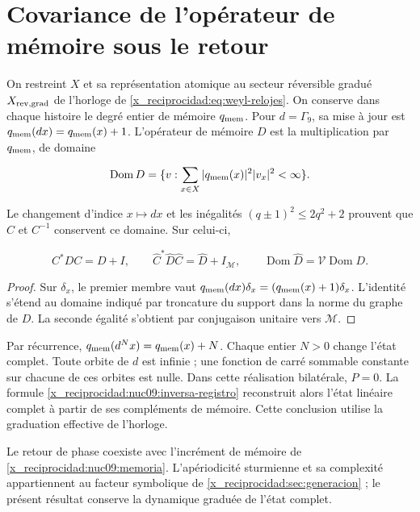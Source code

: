 \section{Covariance de l’opérateur de mémoire sous le retour}

On restreint \(X\) et sa représentation atomique au secteur réversible
gradué \(X_{\rm rev,grad}\) de l’horloge de
\eqref{x_reciprocidad:eq:weyl-relojes}. On conserve dans chaque histoire le degré entier
de mémoire \(q_{\rm mem}\). Pour \(d=\Gamma_9\), sa mise à jour est
\(q_{\rm mem}(dx)=q_{\rm mem}(x)+1\).
L’opérateur de mémoire \(D\) est la multiplication par
\(q_{\rm mem}\), de domaine



\[
\operatorname{Dom}D=\{v:\sum_{x\in X}|q_{\rm mem}(x)|^2|v_x|^2<\infty\}.
\]



Le changement d’indice \(x\mapsto dx\) et les inégalités
\((q\pm1)^2\le2q^2+2\) prouvent que \(C\) et \(C^{-1}\)
conservent ce domaine. Sur celui-ci,



\begin{equation}
C^*DC=D+I,\qquad
\widehat C^*\widehat D\widehat C=\widehat D+I_{\mathcal M},
\qquad\operatorname{Dom}\widehat D=\mathcal V\operatorname{Dom}D.
\label{x_reciprocidad:nuc09:memoria}
\end{equation}



\begin{proof}
Sur \(\delta_x\), le premier membre vaut
\(q_{\rm mem}(dx)\delta_x=(q_{\rm mem}(x)+1)\delta_x\).
L’identité s’étend au domaine indiqué par troncature du
support dans la norme du graphe de \(D\).
La seconde égalité s’obtient par conjugaison unitaire vers
\(\mathcal M\).
\end{proof}

Par récurrence,
\(q_{\rm mem}(d^Nx)=q_{\rm mem}(x)+N\).
Chaque entier \(N>0\) change l’état complet.
Toute orbite de \(d\) est infinie ; une fonction de carré sommable
constante sur chacune de ces orbites est nulle.
Dans cette réalisation bilatérale, \(P=0\).
La formule \eqref{x_reciprocidad:nuc09:inversa-registro} reconstruit alors
l’état linéaire complet à partir de ses compléments de mémoire.
Cette conclusion utilise la graduation effective de l’horloge.

Le retour de phase coexiste avec l’incrément de mémoire de
\eqref{x_reciprocidad:nuc09:memoria}.
L’apériodicité sturmienne et sa complexité appartiennent au facteur
symbolique de \cref{x_reciprocidad:sec:generacion} ; le présent résultat conserve
la dynamique graduée de l’état complet.

